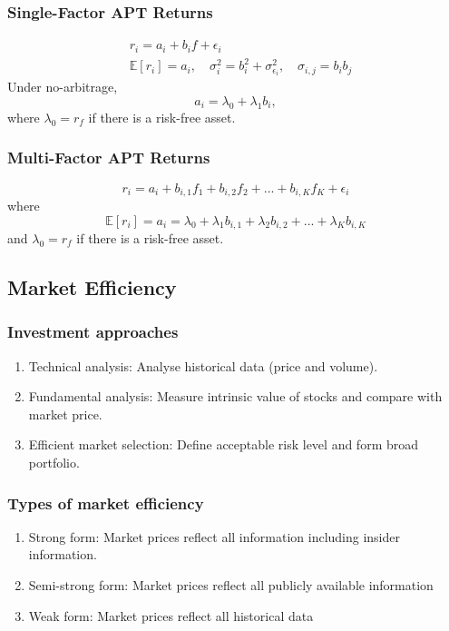 \documentclass[11pt]{article}
\newcommand{\E}{\mathbb{E}}
\begin{document}
	\subsubsection{Single-Factor APT Returns}
	\begin{align*}
		& r_i = a_i + b_i f + \epsilon_i\\[5pt]
		& \E[r_i] = a_i,\quad \sigma_i^2 = b_i^2 + \sigma_{\epsilon_i}^2,\quad\sigma_{i, j} = b_{i}b_{j}
	\end{align*}
	Under no-arbitrage, 
	\[	a_i = \lambda_0 + \lambda_1 b_i,\]
	where \( \lambda_0 = r_f \) if there is a risk-free asset.
	\subsubsection{Multi-Factor APT Returns}
	\[	r_i = a_i + b_{i,1 }f_1 + b_{i,2} f_2 + ... + b_{i, K}f_K + \epsilon_i\]
	where
	\[	\E[r_i] = a_i = \lambda_0 + \lambda_1 b_{i,1} + \lambda_2 b_{i, 2} + ... + \lambda_K b_{i, K}\]
	and \( \lambda_0 = r_f \) if there is a risk-free asset.
	\subsection{Market Efficiency}
	\subsubsection{Investment approaches}
	\begin{enumerate}
		\item Technical analysis: Analyse historical data (price and volume).
		\item Fundamental analysis: Measure intrinsic value of stocks and compare with market price.
		\item Efficient market selection: Define acceptable risk level and form broad portfolio.
	\end{enumerate}
	\subsubsection{Types of market efficiency}
	\begin{enumerate}
		\item Strong form: Market prices reflect all information including insider information.
		\item Semi-strong form: Market prices reflect all publicly available information %
		\item Weak form: Market prices reflect all historical data 
	\end{enumerate}
	\newpage
\end{document}
